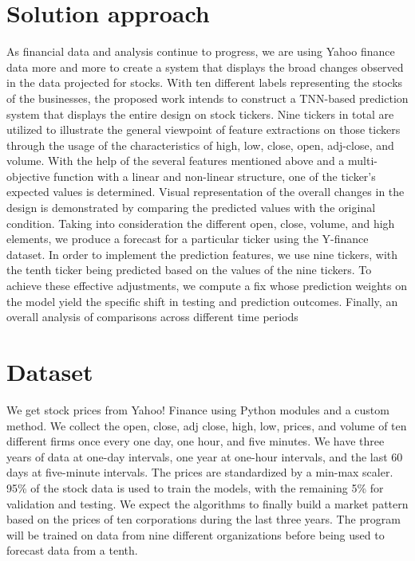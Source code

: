 \section{Solution approach}
\label{sec:intro_sol} %
As financial data and analysis continue to progress, we are using Yahoo finance data more and more to create a system that displays the broad changes observed in the data projected for stocks. With ten different labels representing the stocks of the businesses, the proposed work intends to construct a TNN-based prediction system that displays the entire design on stock tickers. Nine tickers in total are utilized to illustrate the general viewpoint of feature extractions on those tickers through the usage of the characteristics of high, low, close, open, adj-close, and volume. With the help of the several features mentioned above and a multi-objective function with a linear and non-linear structure, one of the ticker's expected values is determined. Visual representation of the overall changes in the design is demonstrated by comparing the predicted values with the original condition.
Taking into consideration the different open, close, volume, and high elements, we produce a forecast for a particular ticker using the Y-finance dataset. In order to implement the prediction features, we use nine tickers, with the tenth ticker being predicted based on the values of the nine tickers. To achieve these effective adjustments, we compute a fix whose prediction weights on the model yield the specific shift in testing and prediction outcomes. Finally, an overall analysis of comparisons across different time periods

\section{Dataset} %
\label{sec:intro_sum_results} %
We get stock prices from Yahoo! Finance using Python modules and a custom method. We collect the open, close, adj close, high, low, prices, and volume of ten different firms once every one day, one hour, and five minutes. We have three years of data at one-day intervals, one year at one-hour intervals, and the last 60 days at five-minute intervals. The prices are standardized by a min-max scaler. 95\% of the stock data is used to train the models, with the remaining 5\% for validation and testing. We expect the algorithms to finally build a market pattern based on the prices of ten corporations during the last three years. The program will be trained on data from nine different organizations before being used to forecast data from a tenth.





